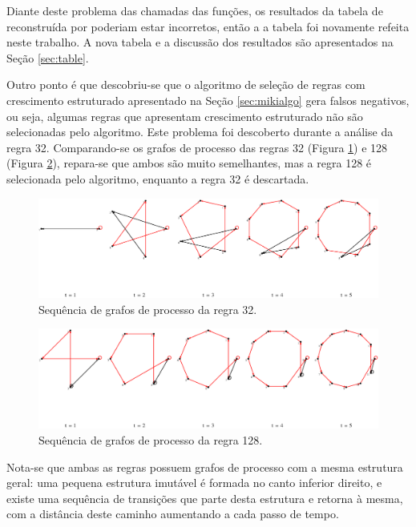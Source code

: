 \documentclass[12pt,a4paper]{article}
\begin{document}
Diante deste problema das chamadas das funções, os resultados da tabela de
 reconstruída por  poderiam
estar incorretos, então a a tabela foi novamente refeita neste trabalho. A nova tabela e a
discussão dos resultados são apresentados na Seção \ref{sec:table}.

Outro ponto é que descobriu-se que o algoritmo de seleção de regras com
crescimento estruturado apresentado na Seção \ref{sec:mikialgo} gera falsos
negativos, ou seja, algumas regras que apresentam crescimento estruturado
não são selecionadas pelo algoritmo. Este problema foi descoberto durante
a análise da regra 32. Comparando-se os grafos de processo das regras
32 (Figura \ref{fig:r32t}) e 128 (Figura \ref{fig:r128t}), repara-se que
ambos são muito semelhantes, mas a regra 128 é selecionada pelo algoritmo,
enquanto a regra 32 é descartada.

\begin{figure}[htp]
\begin{center}
\includegraphics[scale=0.55]{img/Rule32.eps}
\caption{Sequência de grafos de processo da regra 32.}
\label{fig:r32t}
\end{center}
\end{figure}

\begin{figure}[htp]
\begin{center}
\includegraphics[scale=0.55]{img/Rule128.eps}
\caption{Sequência de grafos de processo da regra 128.}
\label{fig:r128t}
\end{center}
\end{figure}

Nota-se que ambas as regras possuem grafos de processo com a mesma estrutura geral:
uma pequena estrutura imutável é formada no canto inferior direito, e existe
uma sequência de transições que parte desta estrutura e retorna à mesma, com
a distância deste caminho aumentando a cada passo de tempo.
\end{document}
